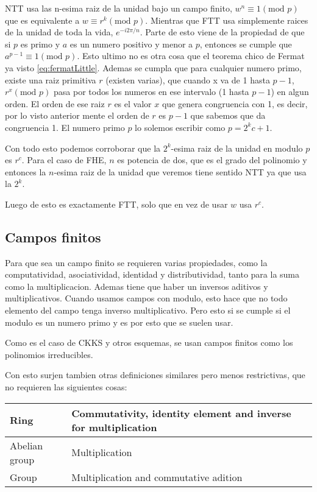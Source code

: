 \documentclass[12pt, oneside]{article}
\begin{document}
NTT usa las n-esima raiz de la unidad bajo un campo finito, $w^n \equiv 1 (\text{mod }p)$ que es equivalente a
$w \equiv r^k (\text{mod }p)$.
Mientras que FTT usa simplemente raices de la unidad de toda la vida, $e^{-i2\pi/n}$.
Parte de esto viene de la propiedad de que si $p$ es primo y $a$ es un numero positivo y menor a $p$,
entonces se cumple que $a^{p-1}\equiv 1 (\text{mod } p)$.
Esto ultimo no es otra cosa que el teorema chico de Fermat ya visto \ref{eq:fermatLittle}.
Ademas se cumpla que para cualquier numero primo, existe una raiz primitiva $r$ (existen varias), que cuando
x va de 1 hasta $p-1$, $r^x (\text{mod }p)$ pasa por todos los numeros en ese intervalo (1 hasta $p-1$) en algun orden.
El orden de ese raiz $r$ es el valor $x$ que genera congruencia con 1, es decir, por lo visto anterior mente
el orden de $r$ es $p-1$ que sabemos que da congruencia 1.
El numero primo $p$ lo solemos escribir como $p = 2^kc+1$.

Con todo esto podemos corroborar que la $2^k$-esima raiz de la unidad en modulo $p$ es $r^c$.
Para el caso de FHE, $n$ es potencia de dos, que es el grado del polinomio y entonces la $n$-esima raiz de la unidad que veremos
tiene sentido NTT ya que usa la $2^k$.

Luego de esto es exactamente FTT, solo que en vez de usar $w$ usa $r^c$.

\subsection{Campos finitos}
Para que sea un campo finito se requieren varias propiedades, como la computatividad, asociatividad, identidad y distributividad, tanto
para la suma como la multiplicacion.
Ademas tiene que haber un inversos aditivos y multiplicativos.
Cuando usamos campos con modulo, esto hace que no todo elemento del campo tenga inverso multiplicativo.
Pero esto si se cumple si el modulo es un numero primo y es por esto que se suelen usar.

Como es el caso de CKKS y otros esquemas, se usan campos finitos como los polinomios irreducibles.

Con esto surjen tambien otras definiciones similares pero menos restrictivas, que no requieren
las siguientes cosas:
\begin{table}[h!]
\centering
\begin{tabular}{|l|l|}
\hline
Ring          & Commutativity, identity element and inverse for multiplication \\ \hline
Abelian group & Multiplication                                                 \\ \hline
Group         & Multiplication and commutative adition                         \\ \hline
\end{tabular}
\end{table}
\end{document}
